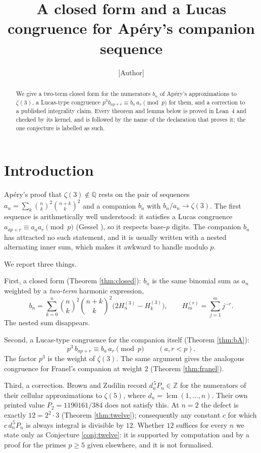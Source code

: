 \documentclass[11pt,a4paper]{amsart}
\title{A closed form and a Lucas congruence for Ap\'ery's companion sequence}
\author{[Author]}
\date{}
\theoremstyle{plain}
\theoremstyle{definition}
\theoremstyle{remark}
\newcommand{\ZZ}{\mathbb{Z}}
\newcommand{\QQ}{\mathbb{Q}}
\DeclareMathOperator{\lcm}{lcm}
\begin{document}
\begin{abstract}
We give a two-term closed form for the numerators $b_n$ of Ap\'ery's approximations
to $\zeta(3)$, a Lucas-type congruence $p^3b_{ap+r}\equiv b_a\,a_r\pmod p$
for them, and a correction to a published integrality claim. Every theorem and lemma
below is proved in Lean~4 and checked by its kernel, and is followed by the name of the
declaration that proves it; the one conjecture is labelled as such.
\end{abstract}
\maketitle

\section{Introduction}

Ap\'ery's proof that $\zeta(3)\notin\QQ$ rests on the pair of sequences
$a_n=\sum_k\binom nk^2\binom{n+k}k^2$ and a companion $b_n$ with $b_n/a_n\to\zeta(3)$.
The first sequence is arithmetically well understood: it satisfies a Lucas congruence
$a_{ap+r}\equiv a_aa_r\pmod p$ (Gessel \cite{Gessel1982}), so it respects base-$p$ digits.
The companion $b_n$ has attracted no such statement, and it is usually written with a
nested alternating inner sum, which makes it awkward to handle modulo $p$.

We report three things.

First, a closed form (Theorem \ref{thm:closed}): $b_n$ is the same binomial sum as $a_n$
weighted by a \emph{two-term} harmonic expression,
\[
  b_n=\sum_{k=0}^n\binom nk^2\binom{n+k}k^2\bigl(2H^{(3)}_n-H^{(3)}_k\bigr),
  \qquad H^{(r)}_m=\sum_{j=1}^m j^{-r}.
\]
The nested sum disappears.

Second, a Lucas-type congruence for the companion itself (Theorem \ref{thm:bA}):
\[
  p^3\,b_{ap+r}\equiv b_a\,a_r \pmod p \qquad (a,r<p).
\]
The factor $p^3$ is the weight of $\zeta(3)$. The same argument gives the analogous
congruence for Franel's companion at weight $2$ (Theorem \ref{thm:franel}).

Third, a correction. Brown and Zudilin \cite{BZ} record $d_n^{\,5}P_n\in\ZZ$ for the
numerators of their cellular approximations to $\zeta(5)$, where $d_n=\lcm(1,\dots,n)$.
Their own printed value $P_2=1190161/384$ does not satisfy this. At $n=2$ the defect is
exactly $12=2^2\cdot3$ (Theorem \ref{thm:twelve}); consequently any constant $c$ for
which $c\,d_n^{\,5}P_n$ is always integral is divisible by $12$. Whether $12$ suffices
for every $n$ we state only as Conjecture \ref{conj:twelve}: it is supported by
computation and by a proof for the primes $p\ge5$ given elsewhere, and it is not
formalised.
\end{document}
